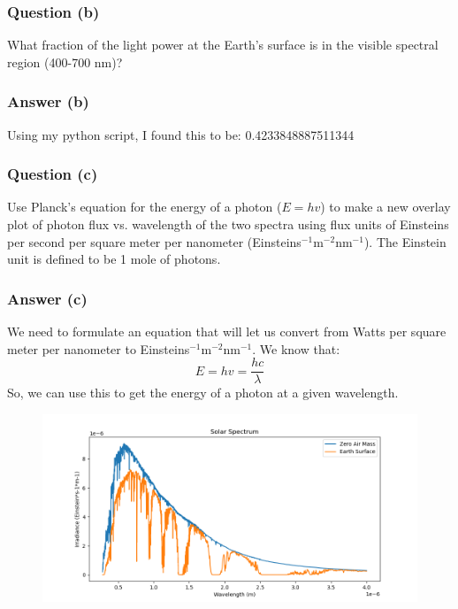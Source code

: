 \documentclass{article}
\begin{document}
\subsubsection{Question (b)}
What fraction of the light power at the Earth's surface is in the visible spectral region (400-700 nm)?

\subsubsection{Answer (b)}
Using my python script, I found this to be: 0.4233848887511344


\subsubsection{Question (c)}
Use Planck's equation for the energy of a photon (\(E = hv\)) to make a new overlay plot of photon flux vs. wavelength of the two spectra using flux units of Einsteins per second per square meter per nanometer (Einsteins\(^{-1}\)m\(^{-2}\)nm\(^{-1}\)). The Einstein unit is defined to be 1 mole of photons.

\subsubsection{Answer (c)}
We need to formulate an equation that will let us convert from Watts per square meter per nanometer to Einsteins\(^{-1}\)m\(^{-2}\)nm\(^{-1}\). We know that:
\begin{equation}
    E = hv = \frac{hc}{\lambda}
\end{equation}
So, we can use this to get the energy of a photon at a given wavelength.
\begin{figure}[h]
    \centering
    \includegraphics[width=\textwidth]{einstein.png}
\end{figure}
\end{document}
